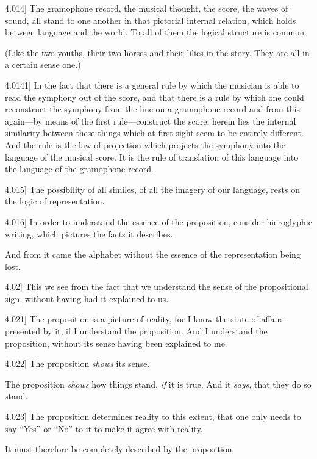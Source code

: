 \documentclass[12pt,oneside]{book}[2007/10/19]
\newcommand{\PropositionE}[2]{%
  \item[\phantomsection\label{PropE:#1}\PropGRef{#1}] #2%
}
\newcommand{\PropGRef}[1]{\hyperref[PropG:#1]{#1}}
\begin{document}
\begin{propositions}
\PropositionE{4.014}
{The gramophone record, the musical thought,
the score, the waves of sound, all stand to one
another in that pictorial internal relation, which
holds between language and the world. To all of
them the logical structure is common.

(Like the two youths, their two horses and their
lilies in the story. They are all in a certain sense
one.)}


\PropositionE{4.0141}
{In the fact that there is a general rule by which
the musician is able to read the symphony out of
the score, and that there is a rule by which one
could reconstruct the symphony from the line on
a gramophone record and from this again---by
means of the first rule---construct the score, herein
lies the internal similarity between these things
which at first sight seem to be entirely different.
And the rule is the law of projection which projects
the symphony into the language of the musical
score. It is the rule of translation of this language
into the language of the gramophone record.}


\PropositionE{4.015}
{The possibility of all similes, of all the
imagery of our language, rests on the logic of
representation.}


\PropositionE{4.016}
{In order to understand the essence of the
proposition, consider hieroglyphic writing, which
pictures the facts it describes.

And from it came the alphabet without the
essence of the representation being lost.}


\PropositionE{4.02}
{This we see from the fact that we understand
the sense of the propositional sign, without having
had it explained to us.}


\PropositionE{4.021}
{The proposition is a picture of reality, for I know
the state of affairs presented by it, if I understand
the proposition. And I understand the proposition,
without its sense having been explained to me.}


\PropositionE{4.022}
{The proposition \emph{shows} its sense.

The proposition \emph{shows} how things stand, \emph{if} it is
true. And it \emph{says}, that they do so stand.}


\PropositionE{4.023}
{The proposition determines reality to this
extent, that one only needs to say ``Yes'' or
``No'' to it to make it agree with reality.

It must therefore be completely described by
the proposition.

}
\end{propositions}
\end{document}
